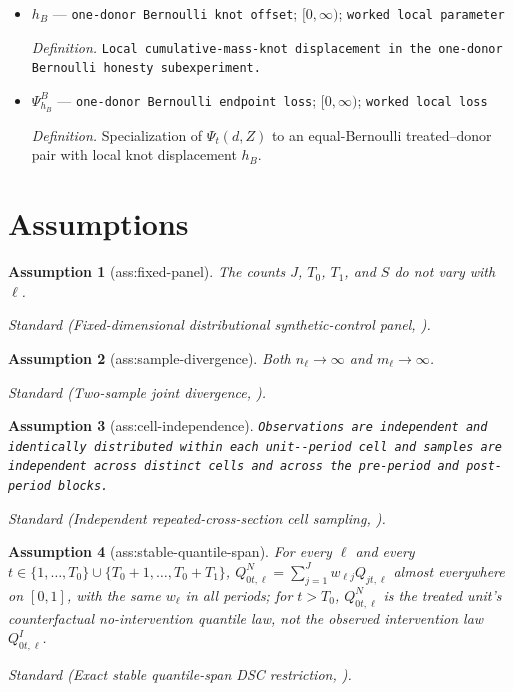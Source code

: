 \documentclass{article}
\newtheorem{assumption}{Assumption}
\begin{document}
\begin{itemize}
  \item \(h_B\) --- \texttt{one-\allowbreak{}donor Bernoulli knot offset}; \([0,\infty)\); \texttt{worked local parameter}
  \par\smallskip\noindent\emph{Definition.} \texttt{Local cumulative-\allowbreak{}mass-\allowbreak{}knot displacement in the one-\allowbreak{}donor Bernoulli honesty subexperiment.}
  \item \(\Psi^B_{h_B}\) --- \texttt{one-\allowbreak{}donor Bernoulli endpoint loss}; \([0,\infty)\); \texttt{worked local loss}
  \par\smallskip\noindent\emph{Definition.} Specialization of \(\Psi_t(d,Z)\) to an equal-Bernoulli treated--donor pair with local knot displacement \(h_B\).
\end{itemize}

\section{Assumptions}

\begin{assumption}[ass:fixed-panel]\label{ass:fixed-panel}
The counts \(J\), \(T_0\), \(T_1\), and \(S\) do not vary with \(\ell\).
\par\smallskip\noindent\emph{Standard} (Fixed-dimensional distributional synthetic-control panel, \cite{Gunsilius2023}).
\end{assumption}

\begin{assumption}[ass:sample-divergence]\label{ass:sample-divergence}
Both \(n_\ell\to\infty\) and \(m_\ell\to\infty\).
\par\smallskip\noindent\emph{Standard} (Two-sample joint divergence, \cite{VanDerVaartWellner1996}).
\end{assumption}

\begin{assumption}[ass:cell-independence]\label{ass:cell-independence}
\texttt{Observations are independent and identically distributed within each unit-\allowbreak{}-\allowbreak{}period cell and samples are independent across distinct cells and across the pre-\allowbreak{}period and post-\allowbreak{}period blocks.}
\par\smallskip\noindent\emph{Standard} (Independent repeated-cross-section cell sampling, \cite{Gunsilius2023}).
\end{assumption}

\begin{assumption}[ass:stable-quantile-span]\label{ass:stable-quantile-span}
For every \(\ell\) and every \(t\in\{1,\ldots,T_0\}\cup\{T_0+1,\ldots,T_0+T_1\}\), \(Q^N_{0t,\ell}=\sum_{j=1}^Jw_{\ell j}Q_{jt,\ell}\) almost everywhere on \([0,1]\), with the same \(w_\ell\) in all periods; for \(t>T_0\), \(Q^N_{0t,\ell}\) is the treated unit's counterfactual no-intervention quantile law, not the observed intervention law \(Q^I_{0t,\ell}\).
\par\smallskip\noindent\emph{Standard} (Exact stable quantile-span DSC restriction, \cite{Gunsilius2023}).
\end{assumption}
\end{document}
